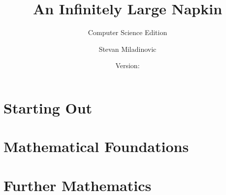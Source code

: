 \documentclass[11pt,twoside=semi,openright,numbers=noenddot,titlepage=false]{scrbook}
\title{An Infinitely Large Napkin}
\subtitle{Computer Science Edition}
\author{Stevan Miladinovic}
\date{Version: \napkinversion}
\begin{document}
\frontmatter
\maketitle

\bgroup{}
\fboxrule=4pt
\egroup{}
\newpage



\setcounter{chapter}{-1} %


\cleardoublepage{}
\setcounter{temppage}{\value{page}}
\mainmatter{}
\setcounter{page}{\value{temppage}}

\tableofcontents


\part{Starting Out}\label{part:startout}
\parttoc{}
\setcounter{chapter}{-1} %


\part{Mathematical Foundations}\label{part:foundations}
\parttoc{}

% 
% 


% 
% 

\part{Further Mathematics}\label{part:maths}
\parttoc{}
% 
% 
%  
%  
%  
%  
%  
%  
%  
% 
% 
%  
%  
%  
%  
%  
% 
% 
% 
\end{document}

